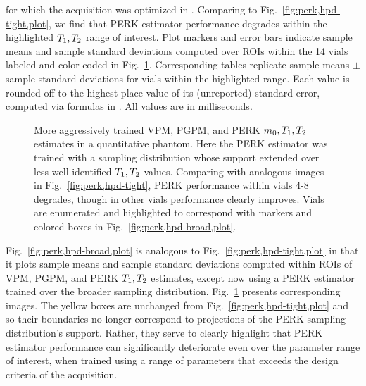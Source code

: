 \begin{figure*}[!t]
{		for which the acquisition was optimized 
		in \cite{nataraj:17:oms}.
		Comparing to Fig.~\ref{fig:perk,hpd-tight,plot},
		we find that PERK estimator performance degrades 
		within the highlighted $T_1,T_2$ range of interest.
		Plot markers and error bars
		indicate sample means and sample standard deviations
		computed over ROIs
		within the 14 vials
		labeled and color-coded
		in Fig.~\ref{fig:perk,hpd-broad}.
		Corresponding tables replicate 
		sample means $\pm$ sample standard deviations
		for vials within the highlighted range.
		Each value is rounded off
		to the highest place value 
		of its (unreported) standard error,
		computed via formulas in \cite{ahn:03:seo}.
		All values are in milliseconds.
	}
	\label{fig:perk,hpd-broad,plot}
\end{figure*}

\begin{figure}[!t]
	\centering
	\begin{minipage}{\textwidth}
  	\hspace{0cm}
  	\hspace{0cm}
	\end{minipage}
	\caption{%
		More aggressively trained 
		VPM, PGPM, and PERK $m_0,T_1,T_2$ estimates
		in a quantitative phantom.
		Here the PERK estimator was trained
		with a sampling distribution
		whose support extended
		over less well identified $T_1,T_2$ values.
		Comparing with analogous images 
		in Fig.~\ref{fig:perk,hpd-tight},
		PERK performance within vials 4-8 degrades,
		though in other vials 
		performance clearly improves. 
		Vials are enumerated and highlighted
		to correspond with markers and colored boxes
		in Fig.~\ref{fig:perk,hpd-broad,plot}.
	}
	\label{fig:perk,hpd-broad}
\end{figure}

Fig.~\ref{fig:perk,hpd-broad,plot} 
is analogous to Fig.~\ref{fig:perk,hpd-tight,plot}
in that it plots sample means and sample standard deviations
computed within ROIs 
of VPM, PGPM, and PERK $T_1,T_2$ estimates,
except now using a PERK estimator trained
over the broader sampling distribution.
Fig.~\ref{fig:perk,hpd-broad} presents corresponding images. 
The yellow boxes are unchanged
from Fig.~\ref{fig:perk,hpd-tight,plot}
and so their boundaries no longer correspond
to projections of the PERK sampling distribution's support.
Rather,
they serve to clearly highlight 
that PERK estimator performance
can significantly deteriorate
even over the parameter range of interest,
when trained using a range of parameters
that exceeds the design criteria
of the acquisition.

